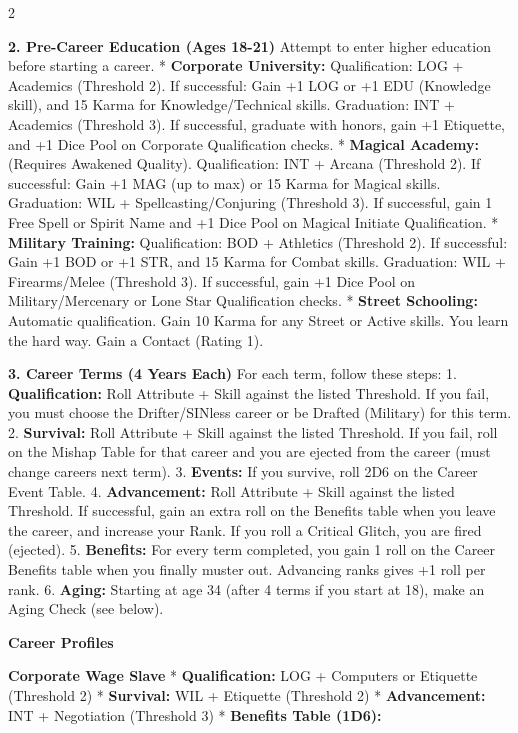 \documentclass[
  oneside]{article}
\begin{document}
\begin{multicols}{2}

\textbf{2. Pre-Career Education (Ages 18-21)}
Attempt to enter higher education before starting
a career. * \textbf{Corporate University:}
Qualification: LOG + Academics (Threshold 2). If
successful: Gain +1 LOG or +1 EDU (Knowledge
skill), and 15 Karma for Knowledge/Technical
skills. Graduation: INT + Academics (Threshold 3).
If successful, graduate with honors, gain +1
Etiquette, and +1 Dice Pool on Corporate
Qualification checks. * \textbf{Magical Academy:}
(Requires Awakened Quality). Qualification: INT +
Arcana (Threshold 2). If successful: Gain +1 MAG
(up to max) or 15 Karma for Magical skills.
Graduation: WIL + Spellcasting/Conjuring
(Threshold 3). If successful, gain 1 Free Spell or
Spirit Name and +1 Dice Pool on Magical Initiate
Qualification. * \textbf{Military Training:}
Qualification: BOD + Athletics (Threshold 2). If
successful: Gain +1 BOD or +1 STR, and 15 Karma
for Combat skills. Graduation: WIL +
Firearms/Melee (Threshold 3). If successful, gain
+1 Dice Pool on Military/Mercenary or Lone Star
Qualification checks. * \textbf{Street Schooling:}
Automatic qualification. Gain 10 Karma for any
Street or Active skills. You learn the hard way.
Gain a Contact (Rating 1).

\textbf{3. Career Terms (4 Years Each)} For each
term, follow these steps: 1.
\textbf{Qualification:} Roll Attribute + Skill
against the listed Threshold. If you fail, you
must choose the Drifter/SINless career or be
Drafted (Military) for this term. 2.
\textbf{Survival:} Roll Attribute + Skill against
the listed Threshold. If you fail, roll on the
Mishap Table for that career and you are ejected
from the career (must change careers next term).
3. \textbf{Events:} If you survive, roll 2D6 on
the Career Event Table. 4. \textbf{Advancement:}
Roll Attribute + Skill against the listed
Threshold. If successful, gain an extra roll on
the Benefits table when you leave the career, and
increase your Rank. If you roll a Critical Glitch,
you are fired (ejected). 5. \textbf{Benefits:} For
every term completed, you gain 1 roll on the
Career Benefits table when you finally muster out.
Advancing ranks gives +1 roll per rank. 6.
\textbf{Aging:} Starting at age 34 (after 4 terms
if you start at 18), make an Aging Check (see
below).

\textbf{Career Profiles}

\textbf{Corporate Wage Slave} *
\textbf{Qualification:} LOG + Computers or
Etiquette (Threshold 2) * \textbf{Survival:} WIL +
Etiquette (Threshold 2) * \textbf{Advancement:}
INT + Negotiation (Threshold 3) * \textbf{Benefits
Table (1D6):}

\end{multicols}
\end{document}
